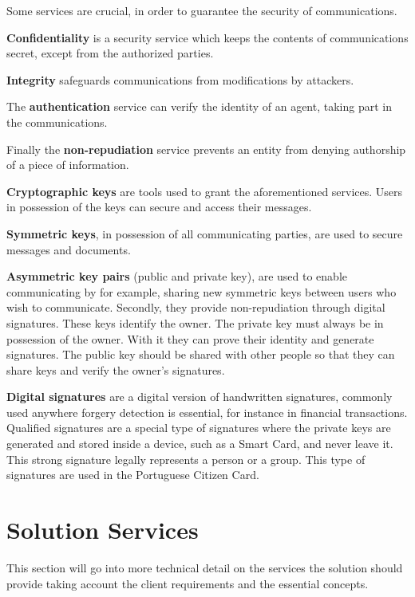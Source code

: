 Some services are crucial, in order to guarantee the security of communications.

\textbf{Confidentiality} is a security service which keeps the contents of communications secret, except from the authorized parties.

\textbf{Integrity} safeguards communications from modifications by attackers.

The \textbf{authentication} service can verify the identity of an agent, taking part in the communications.

Finally the \textbf{non-repudiation} service prevents an entity from denying authorship of a piece of information.

\textbf{Cryptographic keys} are tools used to grant the aforementioned services. Users in possession of the keys can secure and access their messages.

\textbf{Symmetric keys}, in possession of all communicating parties, are used to secure messages and documents.

\textbf{Asymmetric key pairs} (public and private key), are used to enable communicating by for example, sharing new symmetric keys between users who wish to communicate. Secondly, they provide non-repudiation through digital signatures.
These keys identify the owner. The private key must always be in possession of the owner. With it they can prove their identity and generate signatures.
The public key should be shared with other people so that they can share keys and verify the owner's signatures.

\textbf{Digital signatures} are a digital version of handwritten signatures, commonly used anywhere forgery detection is essential, for instance in financial transactions.
Qualified signatures are a special type of signatures where the private keys are generated and stored inside a device, such as a Smart Card, and never leave it.
This strong signature legally represents a person or a group. This type of signatures are used in the Portuguese Citizen Card.

\section{Solution Services}\label{chap:problem:services}


This section will go into more technical detail on the services the solution should provide taking account the client requirements and the essential concepts.

